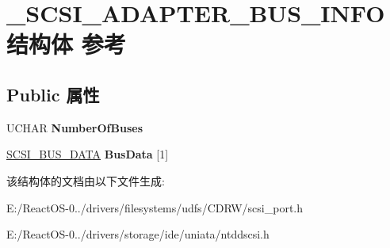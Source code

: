 \hypertarget{struct___s_c_s_i___a_d_a_p_t_e_r___b_u_s___i_n_f_o}{}\section{\+\_\+\+S\+C\+S\+I\+\_\+\+A\+D\+A\+P\+T\+E\+R\+\_\+\+B\+U\+S\+\_\+\+I\+N\+F\+O结构体 参考}
\label{struct___s_c_s_i___a_d_a_p_t_e_r___b_u_s___i_n_f_o}
\subsection*{Public 属性}
\begin{DoxyCompactItemize}
\item 
\mbox{\label{struct___s_c_s_i___a_d_a_p_t_e_r___b_u_s___i_n_f_o_aea568d23fa416795b82bd85fb630a701}} 
U\+C\+H\+AR {\bfseries Number\+Of\+Buses}
\item 
\mbox{\label{struct___s_c_s_i___a_d_a_p_t_e_r___b_u_s___i_n_f_o_abe34422dc7fec690337c72e2693f359e}} 
\hyperlink{struct___s_c_s_i___b_u_s___d_a_t_a}{S\+C\+S\+I\+\_\+\+B\+U\+S\+\_\+\+D\+A\+TA} {\bfseries Bus\+Data} \mbox{[}1\mbox{]}
\end{DoxyCompactItemize}


该结构体的文档由以下文件生成\+:\begin{DoxyCompactItemize}
\item 
E\+:/\+React\+O\+S-\/0../drivers/filesystems/udfs/\+C\+D\+R\+W/scsi\+\_\+port.\+h\item 
E\+:/\+React\+O\+S-\/0../drivers/storage/ide/uniata/ntddscsi.\+h\end{DoxyCompactItemize}
